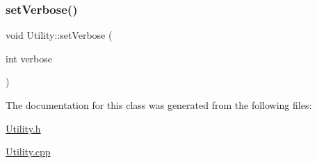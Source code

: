 \subsubsection{\texorpdfstring{set\+Verbose()}{setVerbose()}}
{\footnotesize\ttfamily void Utility\+::set\+Verbose (\begin{DoxyParamCaption}\item[{int}]{verbose }\end{DoxyParamCaption})}



The documentation for this class was generated from the following files\+:\begin{DoxyCompactItemize}
\item 
\mbox{\hyperlink{_utility_8h}{Utility.\+h}}\item 
\mbox{\hyperlink{_utility_8cpp}{Utility.\+cpp}}\end{DoxyCompactItemize}
